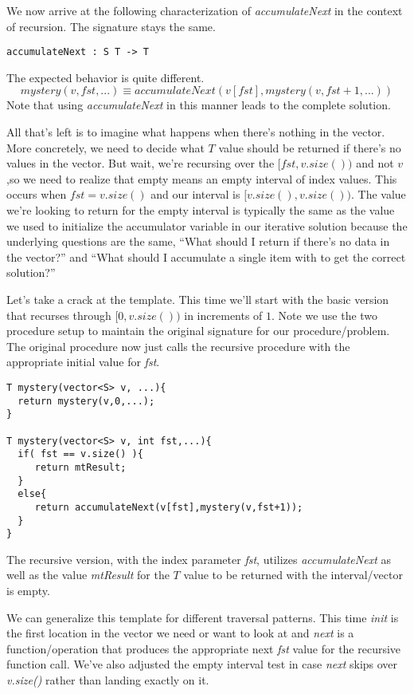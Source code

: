 \documentclass[]{tufte-handout}
\begin{document}
We now arrive at the following characterization of \textit{accumulateNext} in the context of recursion. The signature stays the same.
\begin{verbatim}
accumulateNext : S T -> T    
\end{verbatim}
The expected behavior is quite different.
\begin{equation*}
mystery(v,fst,...) \equiv accumulateNext(v[fst],mystery(v,fst+1,...))
\end{equation*}
Note that using \textit{accumulateNext} in this manner leads to the complete solution.  

All that's left is to imagine what happens when there's nothing in the vector. More concretely, we need to decide what $T$ value should be returned if there's no values in the vector. But wait, we're recursing over the $[fst,v.size() )$ and not $v$,so  we need to realize that empty means an empty interval of index values.  This occurs when $fst = v.size()$ and our interval is $[v.size(),v.size() )$. The value we're looking to return for the empty interval is typically the same as the value we used to initialize the accumulator variable in our iterative solution because the underlying questions are the same, ``What should I return if there's no data in the vector?'' and ``What should I accumulate a single item with to get the correct solution?''

Let's take a crack at the template. This time we'll start with the basic version that recurses through $[0,v.size() )$ in increments of $1$.  Note we use the two procedure setup to maintain the original signature for our procedure/problem.  The original procedure now just calls the recursive procedure with the appropriate initial value for \textit{fst}.
\begin{verbatim}
T mystery(vector<S> v, ...){
  return mystery(v,0,...);
}

T mystery(vector<S> v, int fst,...){
  if( fst == v.size() ){
     return mtResult;
  }
  else{
     return accumulateNext(v[fst],mystery(v,fst+1));
  }
}
\end{verbatim}
The recursive version, with the index parameter \textit{fst}, utilizes \textit{accumulateNext} as well as the value \textit{mtResult} for the $T$ value to be returned with the interval/vector is empty.

We can generalize this template for different traversal patterns.  This time \textit{init} is the first location in the vector we need or want to look at and \textit{next} is a function/operation that produces the appropriate next \textit{fst} value for the recursive function call. We've also adjusted the empty interval test in case \textit{next} skips over \textit{v.size()} rather than landing exactly on it. 
\end{document}
